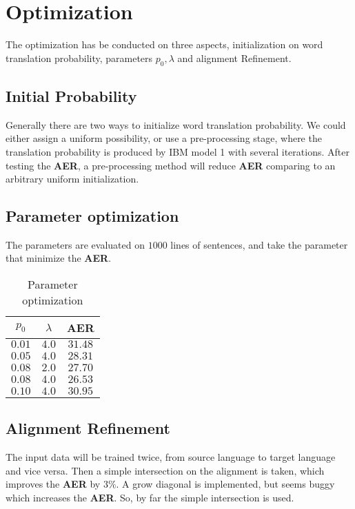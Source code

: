 \documentclass[11pt]{article}
\begin{document}
\section{Optimization} %
\label{sec:optimization}
The optimization has be conducted on three aspects, initialization on word translation probability, parameters $p_0, \lambda$ and alignment Refinement\cite{sym}.
\subsection{Initial Probability} %
\label{sub:initial_probability}
Generally there are two ways to initialize word translation probability. We could either assign a uniform possibility, or use a pre-processing stage, where the translation probability is produced by IBM model 1 with several iterations. After testing the \textbf{AER}, a pre-processing method will reduce \textbf{AER} comparing to an arbitrary uniform initialization.
\subsection{Parameter optimization} %
\label{sub:parameter_optimization}
The parameters are evaluated on $1000$ lines of sentences, and take the parameter that minimize the \textbf{AER}. 
\begin{table}
\centering
\begin{tabular}{ | c | c | c |}
\hline
 $p_0$ & $\lambda$ & AER \\
\hline
$0.01$ & $4.0$ & $31.48$ \\
\hline
$0.05$ & $4.0$ & $28.31$\\
\hline
$0.08$ & $2.0$ & $27.70$\\
\hline
$0.08$ & $4.0$ & $26.53$\\
\hline
$0.10$ & $4.0$ & $30.95$\\
\hline
\end{tabular}
\caption{Parameter optimization}
\end{table}
\subsection{Alignment Refinement} %
\label{sub:alignment_refinement}
The input data will be trained twice, from source language to target language and vice versa. Then a simple intersection on the alignment is taken, which improves the \textbf{AER} by $3\%$. A grow diagonal is implemented, but seems buggy which increases the \textbf{AER}. So, by far the simple intersection is used.
\end{document}
